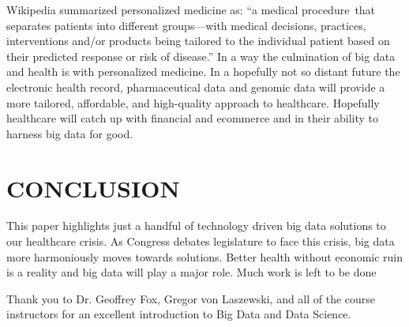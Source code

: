 \documentclass[sigconf]{acmart}
\begin{document}
Wikipedia summarized personalized medicine as: ``a medical
procedure that separates patients into different groups—with medical
decisions, practices, interventions and/or products being tailored to
the individual patient based on their predicted response or risk of
disease.''  \cite{wiki-personalized} In a way the culmination of big
data and health is with personalized medicine.  In a hopefully not so
distant future the electronic health record, pharmaceutical data and
genomic data will provide a more tailored, affordable, and
high-quality approach to healthcare.  Hopefully healthcare will catch
up with financial and ecommerce and in their ability to harness big
data for good.


\section{	CONCLUSION}

This paper highlights just a handful of technology driven big data
solutions to our healthcare crisis.  As Congress debates legislature
to face this crisis, big data more harmoniously moves towards
solutions.  Better health without economic ruin is a reality and big
data will play a major role.  Much work is left to be done

\begin{acks}

Thank you to Dr. Geoffrey Fox, Gregor von Laszewski, and all of the
course instructors for an excellent introduction to Big Data and Data
Science.

\end{acks}



 


\end{document}
